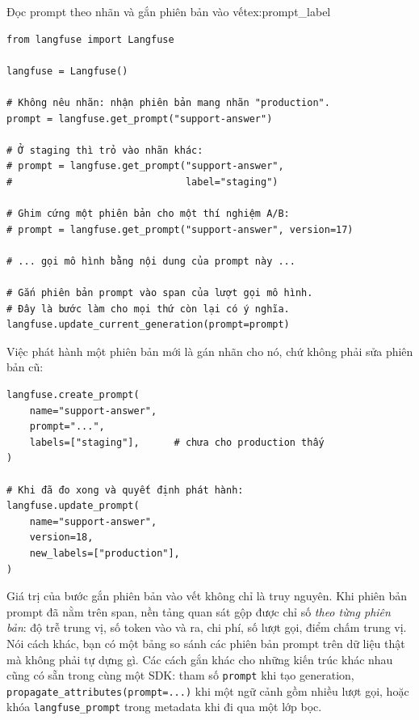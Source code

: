 \begin{example}{Đọc prompt theo nhãn và gắn phiên bản vào vết}{ex:prompt_label}
\begin{verbatim}
from langfuse import Langfuse

langfuse = Langfuse()

# Không nêu nhãn: nhận phiên bản mang nhãn "production".
prompt = langfuse.get_prompt("support-answer")

# Ở staging thì trỏ vào nhãn khác:
# prompt = langfuse.get_prompt("support-answer",
#                              label="staging")

# Ghim cứng một phiên bản cho một thí nghiệm A/B:
# prompt = langfuse.get_prompt("support-answer", version=17)

# ... gọi mô hình bằng nội dung của prompt này ...

# Gắn phiên bản prompt vào span của lượt gọi mô hình.
# Đây là bước làm cho mọi thứ còn lại có ý nghĩa.
langfuse.update_current_generation(prompt=prompt)
\end{verbatim}
Việc phát hành một phiên bản mới là gán nhãn cho nó, chứ không phải sửa phiên bản cũ:
\begin{verbatim}
langfuse.create_prompt(
    name="support-answer",
    prompt="...",
    labels=["staging"],      # chưa cho production thấy
)

# Khi đã đo xong và quyết định phát hành:
langfuse.update_prompt(
    name="support-answer",
    version=18,
    new_labels=["production"],
)
\end{verbatim}
\end{example}

\noindent Giá trị của bước gắn phiên bản vào vết không chỉ là truy nguyên. Khi phiên bản prompt đã nằm trên span, nền tảng quan sát gộp được chỉ số \emph{theo từng phiên bản}: độ trễ trung vị, số token vào và ra, chi phí, số lượt gọi, điểm chấm trung vị. Nói cách khác, bạn có một bảng so sánh các phiên bản prompt trên dữ liệu thật mà không phải tự dựng gì. Các cách gắn khác cho những kiến trúc khác nhau cũng có sẵn trong cùng một SDK: tham số \texttt{prompt} khi tạo generation, \texttt{propagate\_\allowbreak attributes(\allowbreak prompt=.\allowbreak .\allowbreak .\allowbreak )} khi một ngữ cảnh gồm nhiều lượt gọi, hoặc khóa \texttt{langfuse\_prompt} trong metadata khi đi qua một lớp bọc.

